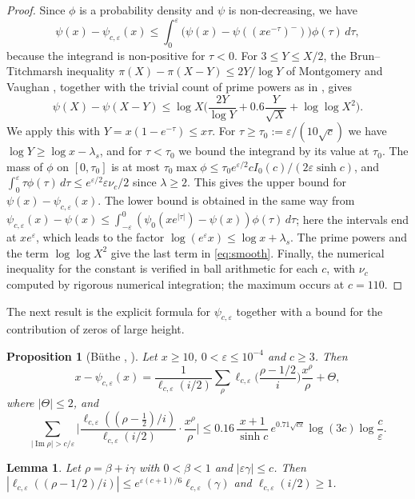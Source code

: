 \documentclass[11pt]{amsart}
\numberwithin{equation}{section}
\newtheorem{lemma}[theorem]{Lemma}
\newtheorem{proposition}[theorem]{Proposition}
\theoremstyle{definition}
\theoremstyle{remark}
\newcommand{\Ip}{\operatorname{Im}}
\newcommand{\eps}{\varepsilon}
\begin{document}
\begin{proof}
Since $\phi$ is a probability density and $\psi$ is non-decreasing, we have
\[
\psi(x) - \psi_{c,\eps}(x) \leq \int_0^\eps\big(\psi(x) - \psi((xe^{-\tau})^-)\big)\phi(\tau)\,d\tau,
\]
because the integrand is non-positive for $\tau < 0$.
For $3 \leq Y \leq X/2$, the Brun--Titchmarsh inequality $\pi(X) - \pi(X-Y) \leq 2Y/\log Y$ of Montgomery and Vaughan \cite{MV73}, together with the trivial count of prime powers as in \cite[(3.9)]{Buthe2018}, gives
\[
\psi(X) - \psi(X - Y) \leq \log X\Big(\frac{2Y}{\log Y} + 0.6\frac{Y}{\sqrt X} + \log\log X^2\Big).
\]
We apply this with $Y = x(1 - e^{-\tau}) \leq x\tau$.
For $\tau \geq \tau_0 := \eps/(10\sqrt c)$ we have $\log Y \geq \log x - \lambda_s$, and for $\tau < \tau_0$ we bound the integrand by its value at $\tau_0$.
The mass of $\phi$ on $[0, \tau_0]$ is at most $\tau_0\max\phi \leq \tau_0e^{\eps/2}cI_0(c)/(2\eps\sinh c)$, and $\int_0^\eps\tau\phi(\tau)\,d\tau \leq e^{\eps/2}\eps\nu_c/2$ since $\lambda \geq 2$.
This gives the upper bound for $\psi(x) - \psi_{c,\eps}(x)$.
The lower bound is obtained in the same way from $\psi_{c,\eps}(x) - \psi(x) \leq \int_{-\eps}^0(\psi_0(xe^{|\tau|}) - \psi(x))\phi(\tau)\,d\tau$; here the intervals end at $xe^{\eps}$, which leads to the factor $\log(e^\eps x) \leq \log x + \lambda_s$.
The prime powers and the term $\log\log X^2$ give the last term in \eqref{eq:smooth}.
Finally, the numerical inequality for the constant is verified in ball arithmetic for each $c$, with $\nu_c$ computed by rigorous numerical integration; the maximum occurs at $c = 110$.
\end{proof}

The next result is the explicit formula for $\psi_{c,\eps}$ together with a bound for the contribution of zeros of large height.

\begin{proposition}[{B\"uthe \cite[Propositions~2 and 3]{Buthe2016}, \cite[Proposition~2]{Buthe2018}}]\label{prop:explicit}
Let $x \geq 10$, $0 < \eps \leq 10^{-4}$ and $c \geq 3$.
Then
\[
x - \psi_{c,\eps}(x) = \frac{1}{\ell_{c,\eps}(i/2)}\sum_\rho\ell_{c,\eps}\Big(\frac{\rho - 1/2}{i}\Big)\frac{x^\rho}{\rho} + \Theta,
\]
where $|\Theta| \leq 2$, and
\[
\sum_{|\Ip\rho| > c/\eps}\Big|\frac{\ell_{c,\eps}((\rho - \frac12)/i)}{\ell_{c,\eps}(i/2)}\cdot\frac{x^\rho}{\rho}\Big| \leq 0.16\,\frac{x+1}{\sinh c}\,e^{0.71\sqrt{c\eps}}\log(3c)\log\frac c\eps.
\]
\end{proposition}

\begin{lemma}\label{lem:logancomplex}
Let $\rho = \beta + i\gamma$ with $0 < \beta < 1$ and $|\eps\gamma| \leq c$.
Then $|\ell_{c,\eps}((\rho - 1/2)/i)| \leq e^{\eps(c+1)/6}\ell_{c,\eps}(\gamma)$ and $\ell_{c,\eps}(i/2) \geq 1$.
\end{lemma}
\end{document}
